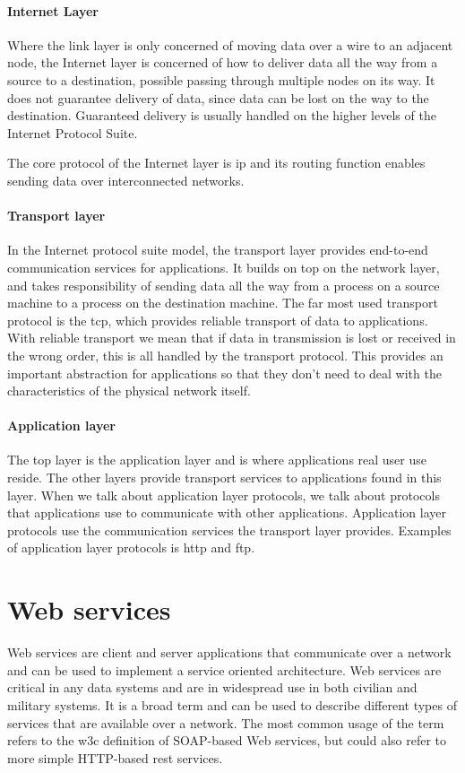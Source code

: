 \paragraph{Internet Layer}

 Where the link layer is only concerned of moving data over a wire to an
 adjacent node, the Internet layer is concerned of how to deliver data all the
 way from a source to a destination, possible passing through multiple nodes on
 its way. It does not guarantee delivery of data, since data can be lost on the
 way to the destination. Guaranteed delivery is usually handled on the higher
 levels of the Internet Protocol Suite.

 The core protocol of the Internet layer is \gls{ip} and its routing function
 enables sending data over interconnected networks.

\paragraph{Transport layer}

In the Internet protocol suite model, the transport layer provides end-to-end
communication services for applications. It builds on top on the network layer,
and takes responsibility of sending data all the way from a process on a source
machine to a process on the destination machine. The far most used transport
protocol is the \gls{tcp}, which provides reliable transport of data to
applications. With reliable transport we mean that if data in transmission is
lost or received in the wrong order, this is all handled by the transport
protocol. This provides an important abstraction for applications so that they
don't need to deal with the characteristics of the physical network itself.

\paragraph{Application layer}

The top layer is the application layer and is where applications real user use
reside. The other layers provide transport services to applications found in
this layer. When we talk about application layer protocols, we talk about
protocols that applications use to communicate with other applications.
Application layer protocols use the communication services the transport layer
provides.  Examples of application layer protocols is \gls{http} and \gls{ftp}.

\section{Web services}
\label{web-services}
Web services are client and server applications that communicate over a
network and can be used to implement a service oriented architecture. Web
services are critical in any data systems and are in widespread use in both
civilian and military systems. It is a broad term and can be used to describe
different types of services that are available over a network. The most common
usage of the term refers to the \gls{w3c} definition of SOAP-based Web
services, but could also refer to more simple HTTP-based \gls{rest} services.

